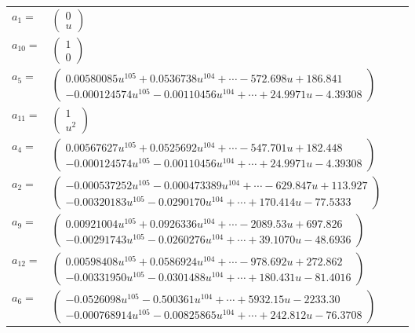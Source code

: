 \documentclass[1p]{elsarticle_modified}
\theoremstyle{definition}
\begin{document}
\begin{tabular}{m{7pt} m{180pt} m{7pt} m{180pt} }
\flushright $a_{1}=$&$\begin{pmatrix}0\\u\end{pmatrix}$ \\
\flushright $a_{10}=$&$\begin{pmatrix}1\\0\end{pmatrix}$ \\
\flushright $a_{5}=$&$\begin{pmatrix}0.00580085 u^{105}+0.0536738 u^{104}+\cdots-572.698 u+186.841\\-0.000124574 u^{105}-0.00110456 u^{104}+\cdots+24.9971 u-4.39308\end{pmatrix}$ \\
\flushright $a_{11}=$&$\begin{pmatrix}1\\u^2\end{pmatrix}$ \\
\flushright $a_{4}=$&$\begin{pmatrix}0.00567627 u^{105}+0.0525692 u^{104}+\cdots-547.701 u+182.448\\-0.000124574 u^{105}-0.00110456 u^{104}+\cdots+24.9971 u-4.39308\end{pmatrix}$ \\
\flushright $a_{2}=$&$\begin{pmatrix}-0.000537252 u^{105}-0.000473389 u^{104}+\cdots-629.847 u+113.927\\-0.00320183 u^{105}-0.0290170 u^{104}+\cdots+170.414 u-77.5333\end{pmatrix}$ \\
\flushright $a_{9}=$&$\begin{pmatrix}0.00921004 u^{105}+0.0926336 u^{104}+\cdots-2089.53 u+697.826\\-0.00291743 u^{105}-0.0260276 u^{104}+\cdots+39.1070 u-48.6936\end{pmatrix}$ \\
\flushright $a_{12}=$&$\begin{pmatrix}0.00598408 u^{105}+0.0586924 u^{104}+\cdots-978.692 u+272.862\\-0.00331950 u^{105}-0.0301488 u^{104}+\cdots+180.431 u-81.4016\end{pmatrix}$ \\
\flushright $a_{6}=$&$\begin{pmatrix}-0.0526098 u^{105}-0.500361 u^{104}+\cdots+5932.15 u-2233.30\\-0.000768914 u^{105}-0.00825865 u^{104}+\cdots+242.812 u-76.3708\end{pmatrix}$ \\

\end{tabular}
\end{document}
